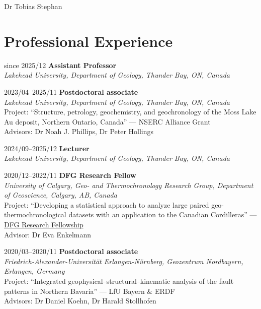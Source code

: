 \documentclass[10pt, paper=letter]{scrartcl} %
\begin{document}
\begin{cv}{\textcolor{myred}{\textsf{Dr Tobias Stephan}}}
    \section{Professional Experience}
    \begin{cvlist}{}
        \item[since 2025/12]  \textbf{Assistant Professor}\\ \textit{Lakehead University,
            Department of Geology, Thunder Bay, ON, Canada}
        \item[2023/04--2025/11] \textbf{Postdoctoral associate}\\ \textit{Lakehead University,
            Department of Geology, Thunder Bay, ON, Canada}\\ Project: \enquote{Structure,
            petrology, geochemistry, and geochronology of the Moss Lake Au deposit,
            Northern Ontario, Canada} --- NSERC Alliance Grant\\ Advisors: Dr Noah J. Phillips, Dr Peter Hollings

        \item[2024/09--2025/12] \textbf {Lecturer}\\ \textit{Lakehead University, Department of
            Geology, Thunder Bay, ON, Canada}

        \item[2020/12--2022/11] \textbf{DFG Research Fellow}\\
        \textit{University of Calgary, Geo- and Thermochronology Research Group, Department of Geoscience, Calgary, AB, Canada}\\
        Project:
        \enquote{Developing a statistical approach to analyze large paired geo-thermochronological datasets with an application to the Canadian Cordilleras} --- \href{https://gepris.dfg.de/gepris/projekt/439621066?language=en}{DFG Research Fellowship}\\
        Advisor: Dr Eva Enkelmann

        \item[2020/03--2020/11] \textbf{Postdoctoral associate}\\
        \textit{
            Friedrich-Alexander-Universit\"at Erlangen-N\"urnberg, Geozentrum Nordbayern, \mbox{Erlangen}, Germany} \\ Project: \enquote{Integrated geophysical–structural–kinematic analysis of the fault patterns in Northern Bavaria} --- LfU Bayern \& ERDF\\
        Advisors: Dr Daniel Koehn, Dr Harald Stollhofen


\end{cvlist}
\end{cv}
\end{document}
